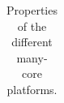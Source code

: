 \documentclass{article}
\begin{document}
\begin{table}[t]
\begin{center}
{\begin{tabular}{|l|l|l|l|l|l|}
\hline
\end{tabular}
} %
\end{center}
\vspace{-0.5cm}
\caption{Properties of the different many-core platforms.}
\label{architecture-properties}
\end{table}

\end{document}
